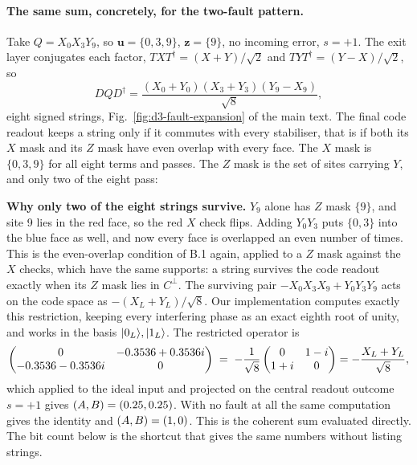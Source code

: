 \paragraph{The same sum, concretely, for the two-fault pattern.} Take $Q=X_0X_3Y_9$, so $\boldsymbol u=\{0,3,9\}$, $\boldsymbol z=\{9\}$, no incoming error, $s=+1$. The exit layer conjugates each factor, $TXT^\dagger=(X+Y)/\sqrt2$ and $TYT^\dagger=(Y-X)/\sqrt2$, so
\[
DQD^\dagger=\frac{(X_0+Y_0)(X_3+Y_3)(Y_9-X_9)}{\sqrt8},
\]
eight signed strings, Fig.~\ref{fig:d3-fault-expansion} of the main text. The final code readout keeps a string only if it commutes with every stabiliser, that is if both its $X$ mask and its $Z$ mask have even overlap with every face. The $X$ mask is $\{0,3,9\}$ for all eight terms and passes. The $Z$ mask is the set of sites carrying $Y$, and only two of the eight pass:
\begin{center}\small\end{center}
\begin{center}
\end{center}
\textbf{Why only two of the eight strings survive.} $Y_9$ alone has $Z$ mask $\{9\}$, and site 9 lies in the red face, so the red $X$ check flips. Adding $Y_0Y_3$ puts $\{0,3\}$ into the blue face as well, and now every face is overlapped an even number of times. 
This is the even-overlap condition of B.1 again, applied to a $Z$ mask against the $X$ checks, which have the same supports: a string survives the code readout exactly when its $Z$ mask lies in $C^\perp$.
The surviving pair $-X_0X_3X_9+Y_0Y_3Y_9$ acts on the code space as $-(X_L+Y_L)/\sqrt8$. Our implementation computes exactly this restriction, keeping every interfering phase as an exact eighth root of unity, and works in the basis $\lvert0_L\rangle,\lvert1_L\rangle$. The restricted operator is
\[
\begin{pmatrix}0&-0.3536+0.3536i\\-0.3536-0.3536i&0\end{pmatrix}\;=\;-\frac{1}{\sqrt8}\begin{pmatrix}0&1-i\\1+i&0\end{pmatrix}=-\frac{X_L+Y_L}{\sqrt8},
\]
which applied to the ideal input and projected on the central readout outcome $s=+1$ gives $(A,B)=(0.25,0.25)$. With no fault at all the same computation gives the identity and $(A,B)=(1,0)$. This is the coherent sum evaluated directly. The bit count below is the shortcut that gives the same numbers without listing strings.


